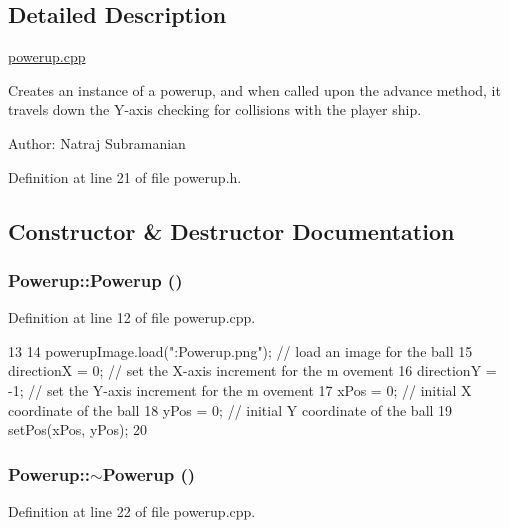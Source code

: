 \subsection{Detailed Description}
\hyperlink{powerup_8cpp}{powerup.cpp}

Creates an instance of a powerup, and when called upon the advance method, it travels down the Y-\/axis checking for collisions with the player ship.

Author: Natraj Subramanian 

Definition at line 21 of file powerup.h.

\subsection{Constructor \& Destructor Documentation}
\hypertarget{class_powerup_a20c3efe6b86d6f358a57f8215d157b20}{
\subsubsection[{Powerup}]{\setlength{\rightskip}{0pt plus 5cm}Powerup::Powerup ()}}
\label{class_powerup_a20c3efe6b86d6f358a57f8215d157b20}


Definition at line 12 of file powerup.cpp.


\begin{DoxyCode}
13 {
14     powerupImage.load(":Powerup.png");          // load an image for the ball
15     directionX = 0;                         // set the X-axis increment for the m
      ovement
16     directionY = -1;                        // set the Y-axis increment for the m
      ovement
17     xPos = 0;                          // initial X coordinate of the ball
18     yPos = 0;                          // initial Y coordinate of the ball
19     setPos(xPos, yPos);
20 }
\end{DoxyCode}
\hypertarget{class_powerup_a2e1c97859d671527885e6f4eb200ca3f}{
\subsubsection[{$\sim$Powerup}]{\setlength{\rightskip}{0pt plus 5cm}Powerup::$\sim$Powerup ()}}
\label{class_powerup_a2e1c97859d671527885e6f4eb200ca3f}


Definition at line 22 of file powerup.cpp.


